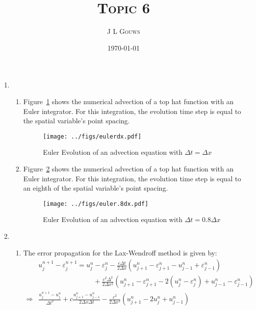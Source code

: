 \documentclass[12pt,a4]{article}
\title{
\textsc{Topic 6}
}
\author{\textsc{J L Gouws}
}
\date{\today
\\[1cm]}
\begin{document}
\thispagestyle{empty}

\maketitle

\begin{enumerate}
  \item
    \begin{enumerate}
      \item
        Figure~\ref{fig:eulerdx} shows the numerical advection of a top hat function with an Euler integrator.
        For this integration, the evolution time step is equal to the spatial variable's point spacing.
        \begin{figure}[H]
          \centering
          \texttt{[image: ../figs/eulerdx.pdf]}
          \caption{Euler Evolution of an advection equation with $\Delta t = \Delta x$}
          \label{fig:eulerdx}
        \end{figure}
      \item
        Figure~\ref{fig:euler.8dx} shows the numerical advection of a top hat function with an Euler integrator.
        For this integration, the evolution time step is equal to an eighth of the spatial variable's point spacing.
        \begin{figure}[H]
          \centering
          \texttt{[image: ../figs/euler.8dx.pdf]}
          \caption{Euler Evolution of an advection equation with $\Delta t = 0.8 \Delta x$}
          \label{fig:euler.8dx}
        \end{figure}
    \end{enumerate}
  \item
    \begin{enumerate}
      \item
        The error propagation for the Lax-Wendroff method is given by:
        \begin{align*}
                      & u^{n+1}_j - \varepsilon^{n+1}_j = u^{n}_j - \varepsilon^{n}_j - \frac{c \Delta t}{2\Delta x} (u^{n}_{j + 1} - \varepsilon^{n}_{j+1} - u^{n}_{j - 1} + \varepsilon^{n}_{j-1})\\
                      & \qquad \qquad \qquad \qquad + \frac{c^2 \Delta^2}{2 \Delta x^2}(u^n_{j + 1} - \varepsilon^n_{j+1} - 2(u^n_j - \varepsilon^n_j) + u^n_{j-1} - \varepsilon^n_{j-1})\\
          \Rightarrow & \frac{u^{n+1}_j - u^n_j}{\Delta t^2} + c \frac{u^{n}_{j + 1} - u^{n}_{j - 1}}{2 \Delta x \Delta t} - \frac{c^2 }{2 \Delta x^2}(u^n_{j + 1} - 2 u^n_j + u^n_{j-1})\\

\end{align*}
\end{enumerate}
\end{enumerate}
\end{document}
